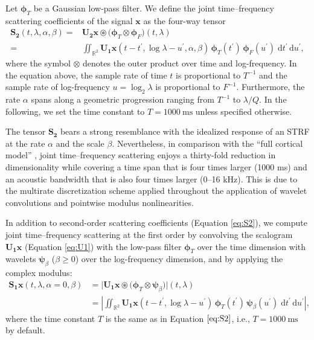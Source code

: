\documentclass{bmcart}
\makeatletter
\newcommand*{\ie}{i.e.,\@\xspace}
\newcommand{\ja}[1]{\textcolor{purple}{JA: #1}\xspace}
\makeatother
\begin{document}
Let $\boldsymbol{\phi}_T$ be a Gaussian low-pass filter.
We define the joint time--frequency scattering coefficients of the signal $\boldsymbol{x}$ as the four-way tensor
\begin{align}
\mathbf{S_2}(t, \lambda, \alpha, \beta)
=&
\mathbf{U_2}\boldsymbol{x}
\circledast
\big(\boldsymbol{\phi}_T  \otimes \boldsymbol{\phi}_F\big)
(t, \lambda)
\nonumber \\
=&
\iint_{\mathbb{R}^2}
\mathbf{U_1}\boldsymbol{x}(t - t^\prime, \log \lambda - u^\prime, \alpha, \beta)
\,\boldsymbol{\phi}_T (t^\prime)
\,\boldsymbol{\phi}_F (u^\prime)
\;\mathrm{d}t^\prime \, \mathrm{d}u^\prime,
\label{eq:S2}
\end{align}
where the symbol $\otimes$ denotes the outer product over time and log-frequency.
In the equation above, the sample rate of time $t$ is proportional to $T^{-1}$ and the sample rate of log-frequency $u=\log_2 \lambda$ is proportional to $F^{-1}$.
Furthermore, the rate $\alpha$ spans along a geometric progression ranging from $T^{-1}$ to $\lambda/Q$.
In the following, we set the time constant to $T=\SI{1000}{\milli\second}$ unless specified otherwise.

The tensor $\mathbf{S_2}$ bears a strong resemblance with the idealized response of an STRF at the rate $\alpha$ and the scale $\beta$.
Nevertheless, in comparison with the ``full cortical model'' \cite{patil2012ploscompbiol}, joint time--frequency scattering enjoys a thirty-fold reduction in dimensionality while covering a time span that is four times larger (1000 ms) and an acoustic bandwidth that is also four times larger (0--16 kHz).
This is due to the multirate discretization scheme applied throughout the application of wavelet convolutions and pointwise modulus nonlinearities.

In addition to second-order scattering coefficients (Equation \ref{eq:S2}), we compute joint time--frequency scattering at the first order by convolving the scalogram $\mathbf{U_1 \boldsymbol{x}}$ (Equation \ref{eq:U1}) with the low-pass filter $\boldsymbol{\phi}_T$ over the time dimension with wavelets $\boldsymbol{\psi}_{\beta}$ ($\beta \geq0$) over the log-frequency dimension, and by applying the complex modulus:
\begin{align}
\mathbf{S_1}\boldsymbol{x}(t, \lambda, \alpha=0, \beta) &=
\big\vert
\mathbf{U_1}\boldsymbol{x} \circledast
\big(\boldsymbol{\phi}_T \otimes \boldsymbol{\psi}_{\beta} \big)
\big\vert (t, \lambda)
\nonumber \\
&=
\left \vert
\iint_{\mathbb{R}^2}
\mathbf{U_1}\boldsymbol{x}(t - t^\prime, \log \lambda - u^\prime)
\,\boldsymbol{\phi}_T (t^\prime)
\,\boldsymbol{\psi}_{\beta} (u^\prime)
\;\mathrm{d}t^\prime \, \mathrm{d}u^\prime
\right \vert,
\label{eq:S1}
\end{align}
where the time constant $T$ is the same as in Equation $\ref{eq:S2}$, \ie{} $T=\SI{1000}{\milli\second}$ by default.
\end{document}
